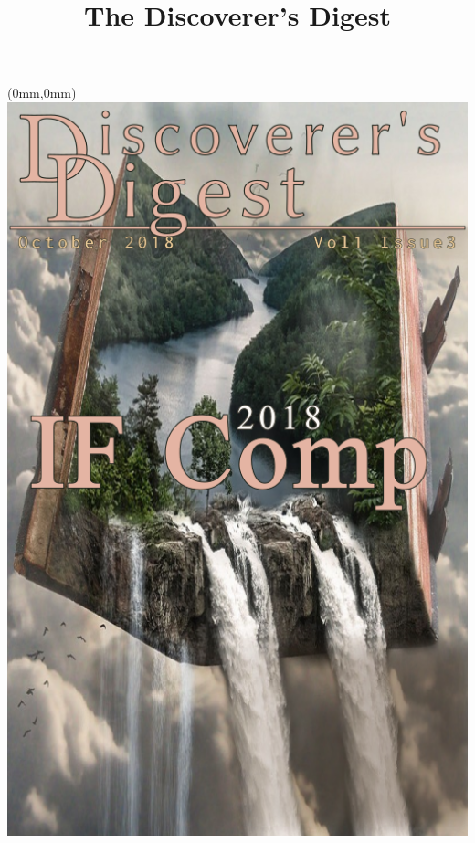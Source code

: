 \documentclass[11.75pt,openany,final]{memoir}
\title{The Discoverer's Digest}
\begin{document}

\chapter*{}

\begin{textblock*}{70.9mm}(0mm,0mm)
\includegraphics[width=\paperwidth]{./media/images/cover}
\end{textblock*}
\thispagestyle{empty}\clearpage %
\end{document}
